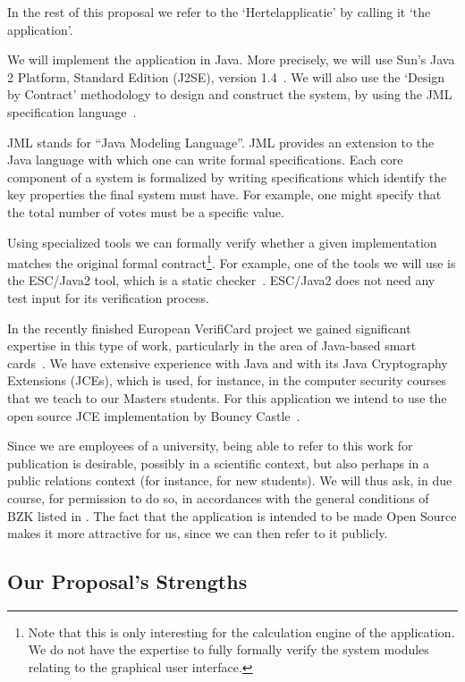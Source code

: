 \documentclass{article}
\begin{document}
In the rest of this proposal we refer to the `Hertelapplicatie' by
calling it `the application'.

We will implement the application in Java.  More precisely, we will
use Sun's Java 2 Platform, Standard Edition (J2SE), version
1.4~\cite{SUNj2se}.  We will also use the `Design by Contract'
methodology to design and construct the system, by using the JML
specification language~\cite{JMLurl}.

JML stands for ``Java Modeling Language''.  JML provides an extension
to the Java language with which one can write formal specifications.
Each core component of a system is formalized by writing
specifications which identify the key properties the final system must
have.  For example, one might specify that the total number of votes
must be a specific value.  

Using specialized tools we can formally verify whether a given
implementation matches the original formal contract\footnote{Note that
  this is only interesting for the calculation engine of the
  application.  We do not have the expertise to fully formally verify
  the system modules relating to the graphical user interface.}.  For
example, one of the tools we will use is the ESC/Java2 tool, which is a
static checker~\cite{ESCurl}.  ESC/Java2 does not need any test input
for its verification process.

In the recently finished European VerifiCard project we gained
significant expertise in this type of work, particularly in the area
of Java-based smart cards~\cite{VERurl}. We have extensive experience
with Java and with its Java Cryptography Extensions (JCEs), which is
used, for instance, in the computer security courses that we teach to
our Masters students.  For this application we intend to use the open
source JCE implementation by Bouncy Castle~\cite{BCurl}.

Since we are employees of a university, being able to refer to this work
for publication is desirable, possibly in a scientific context, but
also perhaps in a public relations context (for instance, for new
students).  We will thus ask, in due course, for permission to do so,
in accordances with the general conditions of BZK listed in \cite{AVODIBZK}.
The fact that the application is intended to be made Open Source makes
it more attractive for us, since we can then refer to it publicly.

\subsection{Our Proposal's Strengths}
\end{document}
